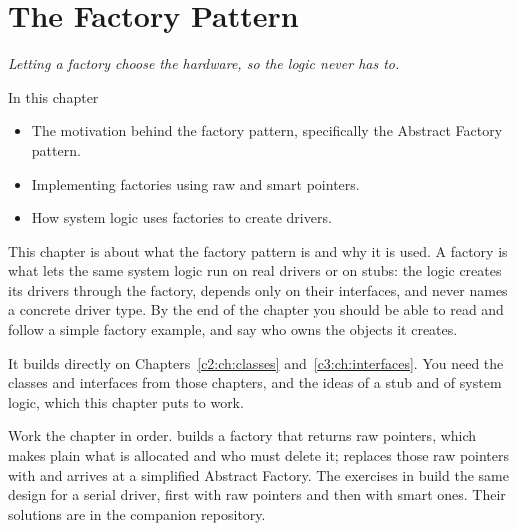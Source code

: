 
\chapter{The Factory Pattern}
\label{c4:ch:factory}

{\large\itshape Letting a factory choose the hardware, so the logic never has to.\par}

\begin{chapterbox}{In this chapter}
\begin{itemize}
  \item The motivation behind the factory pattern, specifically the Abstract Factory pattern.
  \item Implementing factories using raw and smart pointers.
  \item How system logic uses factories to create drivers.
\end{itemize}
\end{chapterbox}

This chapter is about what the factory pattern is and why it is used. A factory is what lets the
same system logic run on real drivers or on stubs: the logic creates its drivers through the
factory, depends only on their interfaces, and never names a concrete driver type. By the end of
the chapter you should be able to read and follow a simple factory example, and say who owns the
objects it creates.

It builds directly on Chapters~\ref{c2:ch:classes} and~\ref{c3:ch:interfaces}. You need the
classes and interfaces from those chapters, and the ideas of a stub and of system logic, which
this chapter puts to work.

Work the chapter in order.  builds a factory that returns raw pointers, which
makes plain what is allocated and who must delete it;  replaces those raw
pointers with  and arrives at a simplified Abstract Factory. The exercises
in  build the same design for a serial driver, first with raw pointers and
then with smart ones. Their solutions are in the companion repository.





